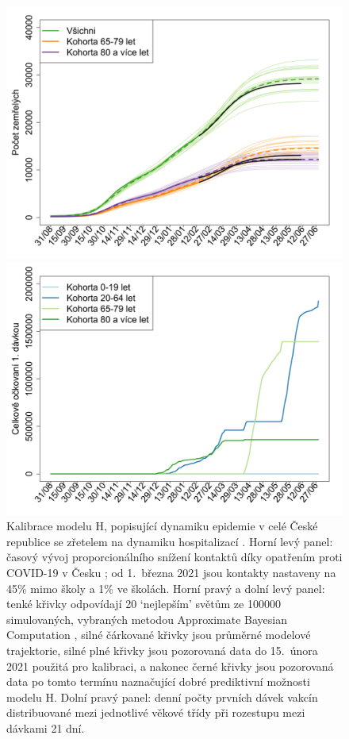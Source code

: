 \begin{figure}[h]
\begin{center}
\begin{minipage}[m]{0.45\linewidth}
			\includegraphics[width=\textwidth]{pic/vakcinace-death.png}
		\end{minipage} 
		\begin{minipage}[m]{0.45\linewidth}
			\includegraphics[width=\textwidth]{pic/vakcinace-davky.png}
		\end{minipage} 
	\end{center}
	\caption{Kalibrace modelu H, popisující dynamiku epidemie v celé České republice se zřetelem na dynamiku hospitalizací \cite{vaccpaper}. Horní levý panel: časový vývoj proporcionálního snížení kontaktů díky opatřením proti COVID-19 v Česku \cite{paqcovid}; od 1.\ března 2021 jsou kontakty nastaveny na 45\% mimo školy a 1\% ve školách. Horní pravý a dolní levý panel: tenké křivky odpovídají 20 `nejlepším' světům ze 100000 simulovaných, vybraných metodou Approximate Bayesian Computation \cite{Toni_etal2009}, silné čárkované křivky jsou průměrné modelové trajektorie, silné plné křivky jsou pozorovaná data do 15.\ února 2021 použitá pro kalibraci, a nakonec černé křivky jsou pozorovaná data po tomto termínu naznačující dobré prediktivní možnosti modelu H. Dolní pravý panel: denní počty prvních dávek vakcín distribuované mezi jednotlivé věkové třídy při rozestupu mezi dávkami 21 dní.}
	\label{kalibraceH}
\end{figure}

